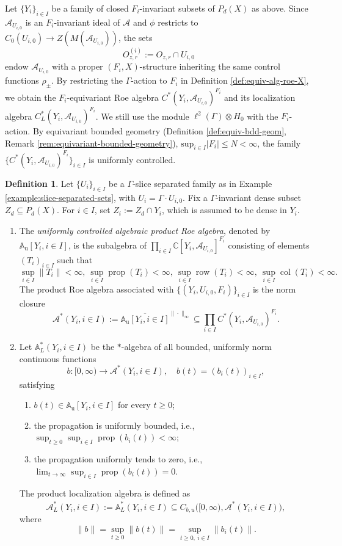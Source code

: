 \documentclass[pdflatex]{sn-jnl}
\theoremstyle{plain}
\theoremstyle{definition}
\newtheorem{definition}[theorem]{Definition}
\begin{document}
Let $\{Y_i\}_{i\in I}$ be a family of closed $F_i$-invariant subsets of $P_{d}(X)$ as above. Since $\mathcal{A}_{U_{i,0}}$ is an $F_i$-invariant ideal of $\mathcal{A}$ and $\phi$ restricts to $C_0(U_{i,0}) \to Z(M(\mathcal{A}_{U_{i,0}}))$, the sets $$O^{(i)}_{z,r}:=O_{z,r}\cap U_{i,0}$$ endow $\mathcal{A}_{U_{i,0}}$ with a proper $(F_i,X)$-structure inheriting the same control functions $\rho_\pm$. By restricting the $\Gamma$-action to $F_i$ in Definition \ref{def:equiv-alg-roe-X}, we obtain the $F_i$-equivariant Roe algebra $C^*(Y_i,\mathcal{A}_{U_{i,0}})^{F_i}$ and its localization algebra $C_L^*(Y_i,\mathcal{A}_{U_{i,0}})^{F_i}$. We still use the module $\ell^2(\Gamma)\otimes H_0$ with the $F_i$-action. By equivariant bounded geometry (Definition \ref{def:equiv-bdd-geom}, Remark \ref{rem:equivariant-bounded-geometry}), $\text{sup}_{i\in I}|F_{i}|\leq N<\infty$, the family $\{C^*(Y_i,\mathcal{A}_{U_{i,0}})^{F_i}\}_{i\in I}$ is uniformly controlled.
\begin{definition}\label{def:product-algebra}
Let $\{U_i\}_{i\in I}$ be a $\Gamma$-slice separated family as in Example \ref{example:slice-separated-sets}, with $U_i=\Gamma\cdot U_{i,0}$. Fix a $\Gamma$-invariant dense subset $Z_{d}\subseteq P_{d}(X)$. For $i\in I$, set $Z_i:=Z_{d}\cap Y_i$, which is assumed to be dense in $Y_i$. 
\begin{enumerate}
\item[(1)]
The \textit{uniformly controlled algebraic product Roe algebra}, denoted by $\mathbb A_{\mathrm u}[Y_i,i\in I]$, is the subalgebra of $\prod_{i\in I}\mathbb C[Y_i,\mathcal{A}_{U_{i,0}}]^{F_i}$ consisting of elements $(T_i)_{i\in I}$ such that
$$\sup_{i\in I}\|T_i\|<\infty,\ \sup_{i\in I}\operatorname{prop}(T_i)<\infty,\ \sup_{i\in I}\operatorname{row}(T_i)<\infty,\ \sup_{i\in I}\operatorname{col}(T_i)<\infty.$$
The product Roe algebra associated with $\{(Y_i,U_{i,0},F_i)\}_{i\in I}$ is the norm closure\[
\mathcal{A}^*(Y_i,i\in I):=
\overline{\mathbb{A}_{\mathrm u}[Y_i,i\in I]}^{\|\cdot\|_\infty}
\subseteq
\prod_{i\in I}
C^*(Y_i,\mathcal{A}_{U_{i,0}})^{F_i}.
\]
\item[(2)]
Let $\mathbb{A}_L^*(Y_i,i\in I)$ be the $*$-algebra of all
bounded, uniformly norm continuous functions
\[b:[0,\infty)\longrightarrow
\mathcal{A}^*(Y_i,i\in I),
\quad
b(t)=(b_i(t))_{i\in I},\]
satisfying
\begin{enumerate}
\item[(i)]
$b(t)\in\mathbb{A}_{\mathrm u}[Y_i,i\in I]$ for every $t\geq 0$;
\item[(ii)]the propagation is uniformly bounded, i.e.,
$\sup_{t\geq0}\sup_{i\in I}
\operatorname{prop}(b_i(t))<\infty$;
\item[(iii)]the propagation uniformly tends to zero, i.e.,
$\lim_{t\to\infty}
\sup_{i\in I}\operatorname{prop}(b_i(t))=0$.
\end{enumerate}
The product localization algebra is defined as
\[\mathcal{A}_L^*(Y_i,i\in I):=
\overline{\mathbb A_L^*(Y_i,i\in I)}
\subseteq
C_{b,u}\bigl([0,\infty),
\mathcal{A}^*(Y_i,i\in I)\bigr),\]
where
\[\|b\|=\sup_{t\geq0}\|b(t)\|=\sup_{t\geq0,\ i\in I}\|b_i(t)\|.
\]
\end{enumerate}
\end{definition}
\end{document}
